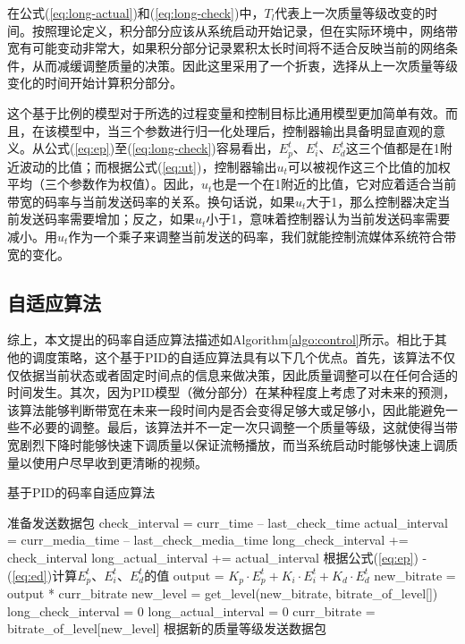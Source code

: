 在公式(\ref{eq:long-actual})和(\ref{eq:long-check})中，$T_l$代表上一次质量等级改变的时间。按照理论定义，积分部分应该从系统启动开始记录，但在实际环境中，网络带宽有可能变动非常大，如果积分部分记录累积太长时间将不适合反映当前的网络条件，从而减缓调整质量的决策。因此这里采用了一个折衷，选择从上一次质量等级变化的时间开始计算积分部分。

这个基于比例的模型对于所选的过程变量和控制目标比通用模型更加简单有效。而且，在该模型中，当三个参数进行归一化处理后，控制器输出具备明显直观的意义。从公式(\ref{eq:ep})至(\ref{eq:long-check})容易看出，$E_p^t$、$E_i^t$、$E_d^t$这三个值都是在1附近波动的比值；而根据公式(\ref{eq:ut})，控制器输出$u_t$可以被视作这三个比值的加权平均（三个参数作为权值）。因此，$u_t$也是一个在1附近的比值，它对应着适合当前带宽的码率与当前发送码率的关系。换句话说，如果$u_t$大于1，那么控制器决定当前发送码率需要增加；反之，如果$u_t$小于1，意味着控制器认为当前发送码率需要减小。用$u_t$作为一个乘子来调整当前发送的码率，我们就能控制流媒体系统符合带宽的变化。

\subsection{自适应算法}

综上，本文提出的码率自适应算法描述如Algorithm\ref{algo:control}所示。相比于其他的调度策略，这个基于PID的自适应算法具有以下几个优点。首先，该算法不仅仅依据当前状态或者固定时间点的信息来做决策，因此质量调整可以在任何合适的时间发生。其次，因为PID模型（微分部分）在某种程度上考虑了对未来的预测，该算法能够判断带宽在未来一段时间内是否会变得足够大或足够小，因此能避免一些不必要的调整。最后，该算法并不一定一次只调整一个质量等级，这就使得当带宽剧烈下降时能够快速下调质量以保证流畅播放，而当系统启动时能够快速上调质量以使用户尽早收到更清晰的视频。

\begin{algorithm}
	\caption{基于PID的码率自适应算法}
	\label{algo:control}
	\begin{algorithmic}
		\STATE 准备发送数据包
		\STATE check\_interval = curr\_time -- last\_check\_time
		\STATE actual\_interval = curr\_media\_time -- last\_check\_media\_time
		\STATE long\_check\_interval += check\_interval
		\STATE long\_actual\_interval += actual\_interval
		\STATE 根据公式(\ref{eq:ep}) - (\ref{eq:ed})计算$E_p^t$、$E_i^t$、$E_d^t$的值
		\STATE output = ${K_p} \cdot E_p^t + {K_i} \cdot E_i^t + {K_d} \cdot E_d^t$
		\STATE new\_bitrate = output * curr\_bitrate
		\STATE new\_level = get\_level(new\_bitrate, bitrate\_of\_level[])
		\STATE long\_check\_interval = 0
		\STATE long\_actual\_interval = 0
		\STATE curr\_bitrate = bitrate\_of\_level[new\_level]
		\ENDIF
		\STATE 根据新的质量等级发送数据包
	\end{algorithmic}
\end{algorithm}

